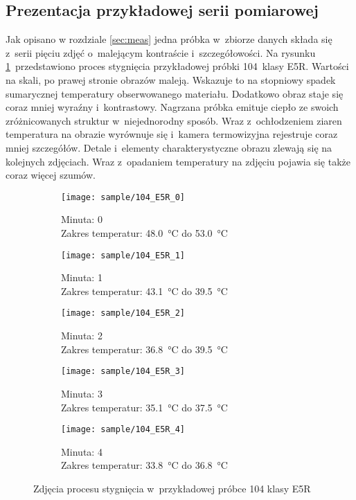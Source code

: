 \subsection{Prezentacja przykładowej serii pomiarowej}
Jak opisano w rozdziale \ref{sec:meas} jedna próbka w~zbiorze danych 
składa się z~serii pięciu zdjęć o~malejącym kontraście i~szczegółowości.
Na rysunku \ref{fig:sample}~przedstawiono proces stygnięcia przykładowej
próbki 104~klasy E5R.
Wartości na skali, po prawej stronie obrazów maleją.
Wskazuje to na stopniowy spadek sumarycznej temperatury obserwowanego
materiału.
Dodatkowo obraz staje się coraz mniej wyraźny i~kontrastowy.
Nagrzana próbka emituje ciepło ze swoich zróżnicowanych struktur
w~niejednorodny sposób.
Wraz z~ochłodzeniem ziaren temperatura na obrazie wyrównuje się i~kamera
termowizyjna rejestruje coraz mniej szczegółów.
Detale i~elementy charakterystyczne obrazu zlewają się na kolejnych zdjęciach.
Wraz z~opadaniem temperatury na zdjęciu pojawia się także coraz więcej szumów.
\begin{figure}[htbp]
	\centering
	\begin{subfigure}{0.45\textwidth}
		\centering
		\texttt{[image: sample/104\_E5R\_0]}
		\caption{Minuta: 0 \\
		         Zakres temperatur: \SI{48.0}{\celsius} do
		         \SI{53.0}{\celsius}}
	\end{subfigure}
	\hspace{0.75cm}
	\vspace{0.5cm}
	\begin{subfigure}{0.45\textwidth}
		\centering
		\texttt{[image: sample/104\_E5R\_1]}
		\caption{Minuta: 1 \\
		         Zakres temperatur: \SI{43.1}{\celsius} do
		         \SI{39.5}{\celsius}}
	\end{subfigure}
	\begin{subfigure}{0.45\textwidth}
		\centering
		\texttt{[image: sample/104\_E5R\_2]}
		\caption{Minuta: 2 \\
		         Zakres temperatur: \SI{36.8}{\celsius} do
		         \SI{39.5}{\celsius}}
	\end{subfigure}
	\hspace{0.75cm}
	\vspace{0.5cm}
	\begin{subfigure}{0.45\textwidth}
		\centering
		\texttt{[image: sample/104\_E5R\_3]}
		\caption{Minuta: 3 \\
		         Zakres temperatur: \SI{35.1}{\celsius} do
		         \SI{37.5}{\celsius}}
	\end{subfigure}
	\begin{subfigure}{0.45\textwidth}
		\centering
		\texttt{[image: sample/104\_E5R\_4]}
		\caption{Minuta: 4 \\
		         Zakres temperatur: \SI{33.8}{\celsius} do
		         \SI{36.8}{\celsius}}
	\end{subfigure}
	\caption{Zdjęcia procesu stygnięcia w~przykładowej próbce 104 klasy E5R}
	\label{fig:sample}
\end{figure}


